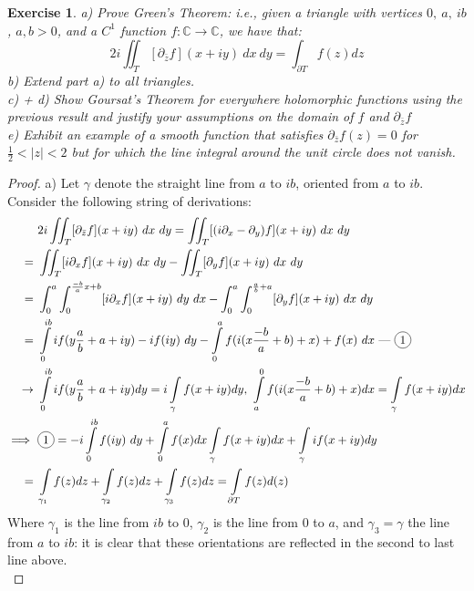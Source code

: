 \documentclass{article}
\newcommand*\circled[1]{\tikz[baseline=(char.base)]{
            \node[shape=circle,draw,inner sep=2pt] (char) {#1};}}
\newcommand{\bb}[1]{\mathbb{#1}}
\newcommand{\del}{\partial}
\newtheorem{exercise}{Exercise}
\begin{document}
\begin{exercise}
  a) Prove Green's Theorem: i.e., given a triangle with vertices $0, \ a, \ ib$, $a,b > 0$, and a $C^{1}$ function $f: \bb{C} \to \bb{C}$, we have that:
  \[
    2i \iint_{T} [\del_{\bar{z}}f](x+iy) \ dx \ dy = \int_{\del T}f(z) dz 
  \]
  b) Extend part a) to all triangles. \\
  c) + d) Show Goursat's Theorem for everywhere holomorphic functions using the previous result and justify your assumptions on the domain of $f$ and $\del_{\bar{z}} f$ \\
  e) Exhibit an example of a smooth function that satisfies $\del_{\bar{z}} f(z) = 0$ for $\frac{1}{2} < |z| < 2$ but for which the line integral around the unit circle does not vanish.
\end{exercise}
\begin{proof}
  a) Let $\gamma$ denote the straight line from $a$ to $ib$, oriented from $a$ to $ib$. Consider the following string of derivations:
  \newpage
  \begin{align*}
    & 2i \iint_{T} [\del_{\bar{z}}f](x+iy) \ dx \ dy = \iint_{T} [(i\del_{x} - \del_{y})f](x+iy) \ dx \ dy \\
    = \ & \iint_{T} [i\del_{x}f](x+iy) \ dx \ dy   - \iint_{T} [\del_{y}f](x+iy) \ dx \ dy \\
    = \ & \int_{0}^{a}\int_{0}^{\frac{-b}{a}x + b}[i\del_{x}f](x+iy) \ dy \ dx - \int_{0}^{a}\int_{0}^{\frac{a}{b} + a}[\del_{y}f](x+iy) \ dx \ dy \\
    = \ & \int\limits_{0}^{ib}if(y \frac{a}{b} + a + iy) - if(iy) \ dy - \int\limits_{0}^{a}f(i(x \frac{-b}{a} + b) + x) + f(x) \ dx \text{ --- } \circled{1}\\
    \rightarrow \ & \int\limits_{0}^{ib}if(y \frac{a}{b} + a + iy)dy  = i \int\limits_{\gamma}f(x+iy)dy, \ \int\limits_{a}^{0} f(i(x \frac{-b}{a} + b) + x)dx =  \int\limits_{\gamma}f(x+iy)dx \\
    \implies  \ &\circled{1} = - i\int\limits_{0}^{ib}f(iy) \ dy + \int\limits_{0}^{a}f(x) dx  \int\limits_{\gamma}f(x+iy) dx + \int\limits_{\gamma}if(x+iy)dy \\
    = \ & \int\limits_{\gamma_{1}}f(z)dz + \int\limits_{\gamma_{2}}f(z)dz + \int\limits_{\gamma_{3}}f(z)dz = \int\limits_{\del T}f(z) d(z)
  \end{align*}
  Where $\gamma_{1}$ is the line from $ib$ to 0, $\gamma_{2}$ is the line from 0 to $a$, and $\gamma_{3} = \gamma$ the line from $a$ to $ib$: it is clear that these orientations are reflected in the second to last line above. \\


\end{proof}
\end{document}
